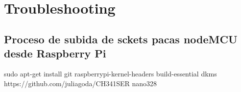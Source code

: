 
\cleardoublepage

\chapter{Troubleshooting}
\label{AppendiB:Key1}

\section{Proceso de subida de sckets pacas nodeMCU desde Raspberry Pi}
\label{AppendiB:Key2}

sudo apt-get install git raspberrypi-kernel-headers build-essential dkms
https://github.com/juliagoda/CH341SER
nano328

